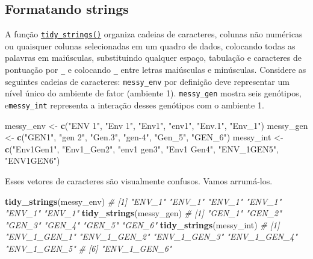\documentclass[
]{book}
\newenvironment{Shaded}{\begin{snugshade}}{\end{snugshade}}
\newcommand{\CommentTok}[1]{\textcolor[rgb]{0.56,0.35,0.01}{\textit{#1}}}
\newcommand{\KeywordTok}[1]{\textcolor[rgb]{0.13,0.29,0.53}{\textbf{#1}}}
\newcommand{\NormalTok}[1]{#1}
\newcommand{\StringTok}[1]{\textcolor[rgb]{0.31,0.60,0.02}{#1}}
\begin{document}

\hypertarget{formatando-strings}{%
\subsection{Formatando strings}\label{formatando-strings}}

A função \href{https://tiagoolivoto.github.io/metan/reference/utils_num_str.html}{\texttt{tidy\_strings()}} organiza cadeias de caracteres, colunas não numéricas ou quaisquer colunas selecionadas em um quadro de dados, colocando todas as palavras em maiúsculas, substituindo qualquer espaço, tabulação e caracteres de pontuação por \texttt{\_} e colocando \texttt{\_} entre letras maiúsculas e minúsculas. Considere as seguintes cadeias de caracteres: \texttt{messy\_env} por definição deve representar um nível único do ambiente de fator (ambiente 1). \texttt{messy\_gen} mostra seis genótipos, e\texttt{messy\_int} representa a interação desses genótipos com o ambiente 1.

\begin{Shaded}
\begin{Highlighting}[]
\NormalTok{messy_env <-}\StringTok{ }\KeywordTok{c}\NormalTok{(}\StringTok{"ENV 1"}\NormalTok{, }\StringTok{"Env 1"}\NormalTok{, }\StringTok{"Env1"}\NormalTok{, }\StringTok{"env1"}\NormalTok{, }\StringTok{"Env.1"}\NormalTok{, }\StringTok{"Env_1"}\NormalTok{)}
\NormalTok{messy_gen <-}\StringTok{ }\KeywordTok{c}\NormalTok{(}\StringTok{"GEN1"}\NormalTok{, }\StringTok{"gen 2"}\NormalTok{, }\StringTok{"Gen.3"}\NormalTok{, }\StringTok{"gen-4"}\NormalTok{, }\StringTok{"Gen_5"}\NormalTok{, }\StringTok{"GEN_6"}\NormalTok{)}
\NormalTok{messy_int <-}\StringTok{ }\KeywordTok{c}\NormalTok{(}\StringTok{"Env1Gen1"}\NormalTok{, }\StringTok{"Env1_Gen2"}\NormalTok{, }\StringTok{"env1 gen3"}\NormalTok{, }\StringTok{"Env1 Gen4"}\NormalTok{, }\StringTok{"ENV_1GEN5"}\NormalTok{, }\StringTok{"ENV1GEN6"}\NormalTok{)}
\end{Highlighting}
\end{Shaded}

Esses vetores de caracteres são visualmente confusos. Vamos arrumá-los.

\begin{Shaded}
\begin{Highlighting}[]
\KeywordTok{tidy_strings}\NormalTok{(messy_env)}
\CommentTok{# [1] "ENV_1" "ENV_1" "ENV_1" "ENV_1" "ENV_1" "ENV_1"}
\KeywordTok{tidy_strings}\NormalTok{(messy_gen)}
\CommentTok{# [1] "GEN_1" "GEN_2" "GEN_3" "GEN_4" "GEN_5" "GEN_6"}
\KeywordTok{tidy_strings}\NormalTok{(messy_int)}
\CommentTok{# [1] "ENV_1_GEN_1" "ENV_1_GEN_2" "ENV_1_GEN_3" "ENV_1_GEN_4" "ENV_1_GEN_5"}
\CommentTok{# [6] "ENV_1_GEN_6"}
\end{Highlighting}
\end{Shaded}
\end{document}
